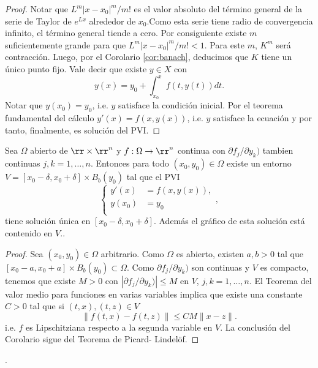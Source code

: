 \begin{proof}
Notar que $L^m|x-x_0|^m/m!$ es el valor absoluto del término general de la serie de Taylor de $e^{Lx}$ alrededor de $x_0$.Como esta serie tiene radio de convergencia infinito, el término general tiende a cero. Por consiguiente existe $m$ suficientemente grande para que $L^m|x-x_0|^m/m!<1$. Para este $m$, $K^m$ será contracción. Luego, por el Corolario \ref{cor:banach},  deducimos que $K$ tiene un único punto fijo. Vale decir que existe $y\in X$ con
\[
 y(x)=y_0+\int_{x_0}^xf(t,y(t))dt.
\]
Notar que $y(x_0)=y_0$, i.e. $y$ satisface la condición inicial. Por el teorema fundamental del cálculo $y'(x)=f(x,y(x))$, i.e. $y$ satisface la ecuación y por tanto, finalmente, es solución del PVI.\end{proof}


\begin{corolario}{} Sea $\Omega$ abierto de $\rr\times \rr^n$ y $f:\Omega\to\rr^n$ continua con $\partial f_j/\partial y_k)$ tambien continuas $j,k=1,\ldots,n$. Entonces para todo $(x_0,y_0)\in\Omega$ existe un entorno $V=[x_0-\delta,x_0+\delta]\times B_b(y_0)$ tal que el PVI
 \[
 \left\{\begin{array}{ll}
	  y'(x)&=f(x,y(x)),\\
	  y(x_0)&=y_0\\         
        \end{array}
\right. ,
\]
tiene solución única en $[x_0-\delta,x_0+\delta]$. Además el gráfico de esta solución está contenido en $V$..
\end{corolario}

\begin{proof} Sea $(x_0,y_0)\in\Omega$ arbitrario. Como $\Omega$ es abierto, existen $a,b>0$ tal que $[x_0-a,x_0+a]\times B_b(y_0)\subset \Omega$. Como $\partial f_j/\partial y_k)$ son continuas y $V$ es compacto, tenemos que existe $M>0$ con $|\partial f_j/\partial y_k)|\leq M$ en $V$, $j,k=1,\ldots,n$. El Teorema del valor medio para funciones en varias variables implica que existe una constante $C>0$ tal que si $(t,x),(t,z)\in V$
\[\|f(t,x)-f(t,z)\|\leq C M\|x-z\|.\]
i.e. $f$ es Lipschitziana respecto a la segunda variable en $V$. La conclusión del Corolario sigue del Teorema de Picard- Lindelöf. 
\end{proof}


   
\nocite{JorgeSotomayor513}.




  
  
